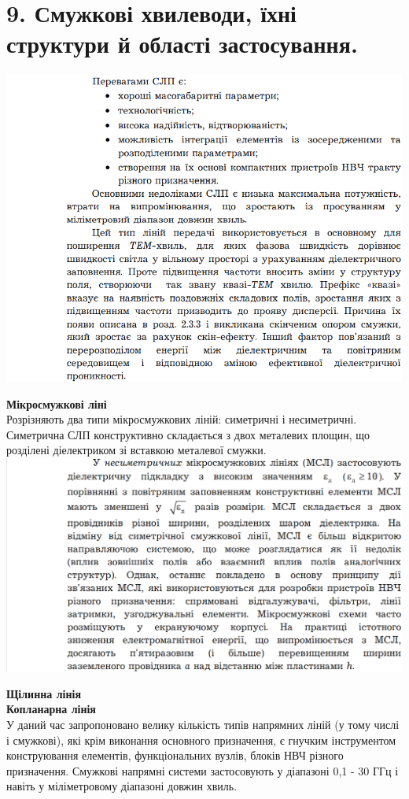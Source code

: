 \documentclass[a4paper,14pt]{extreport}
\begin{document}
\section{9. Смужкові хвилеводи, їхні структури й області застосування.}
\includegraphics[scale=1]{3.png}\par
\textbf{Мікросмужкові ліні}\\
Розрізняють два типи мікросмужкових ліній: симетричні і
несиметричні. Симетрична СЛП конструктивно
складається з двох металевих площин, що розділені діелектриком зі
вставкою металевої смужки.\\
\includegraphics[scale=0.6]{4.png}\par

\textbf{Щілинна лінія}\\
\textbf{Копланарна лінія}\\
У даний час запропоновано велику кількість типів напрямних
ліній (у тому числі і смужкові), які крім виконання основного
призначення, є гнучким інструментом конструювання елементів,
функціональних вузлів, блоків НВЧ різного призначення. Смужкові
напрямні системи застосовують у діапазоні 0,1 - 30 ГГц і навіть у
міліметровому діапазоні довжин хвиль.
\end{document}
